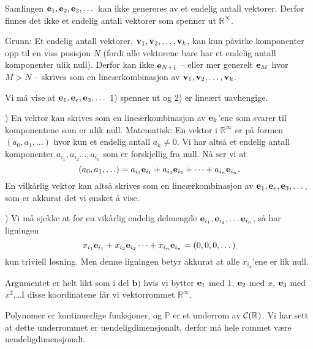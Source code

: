 \begin{losning}

\begin{punkt}
Samlingen $\mathbf{e}_1,\mathbf{e}_2,\mathbf{e}_3,\dots$ kan ikke genereres av et endelig antall vektorer. Derfor finnes det ikke et endelig antall vektorer som spenner ut $\mathbb{R}^\infty$.

\noindent
Grunn: Et endelig antall vektorer, $\mathbf{v}_1,\mathbf{v}_2,\dots,\mathbf{v}_k$, kan kun påvirke komponenter opp til en viss posisjon $N$ (fordi alle vektorene bare har et endelig antall komponenter ulik null). Derfor kan ikke $\mathbf{e}_{N+1}$ -- eller mer generelt $\mathbf{e}_M$ hvor $M>N$ -- skrives som en lineærkombinasjon av $\mathbf{v}_1,\mathbf{v}_2,\dots,\mathbf{v}_k$.
\end{punkt}

\begin{punkt}
Vi må vise at $\mathbf{e}_1,\mathbf{e}_e,\mathbf{e}_3,\dots$ 1) spenner ut og 2) er lineært uavhengige.

) En vektor kan skrives som en lineærkombinasjon av $\mathbf{e}_k$'ene som svarer til komponentene som er ulik null. Matematisk: En vektor i $\mathbb{R}^\infty$ er på formen $(a_0,a_1,\ldots)$ hvor kun et endelig antall $a_k\neq 0$. Vi har altså et endelig antall komponenter $a_{i_1},a_{i_2}\dots,a_{i_n}$ som er forskjellig fra null. Nå ser vi at $$(a_0,a_1,\ldots)=a_{i_1}\mathbf{e}_{i_1}+a_{i_2}\mathbf{e}_{i_2}+\dots+a_{i_n}\mathbf{e}_{i_n}.$$ En vilkårlig vektor kan altså skrives som en lineærkombinasjon av $\mathbf{e}_1,\mathbf{e}_e,\mathbf{e}_3,\dots$, som er akkurat det vi ønsket å vise.

) Vi må sjekke at for en vikårlig endelig delmengde $\mathbf{e}_{i_1},\mathbf{e}_{i_2},\dots\mathbf{e}_{i_n}$, så har ligningen $$x_{i_1}\mathbf{e}_{i_1}+x_{i_2}\mathbf{e}_{i_2}\dots+x_{i_n}\mathbf{e}_{i_n}=(0,0,0,\dots)$$ kun triviell løsning. Men denne ligningen betyr akkurat at alle $x_{i_k}$'ene er lik null.
\end{punkt}


\begin{punkt}
Argumentet er helt likt som i del $\textbf{b)}$ hvis vi bytter $\mathbf{e}_1$ med 1, $\mathbf{e}_2$ med $x$, $\mathbf{e}_3$ med $x^2$,\ldots I disse koordinatene får vi vektorrommet $\mathbb{R}^\infty$.
\end{punkt}

\begin{punkt}
Polynomer er kontinuerlige funksjoner, og $\mathbb{P}$ er et underrom av $\mathcal{C}(\mathbb{R})$. Vi har sett at dette underrommet er uendeligdimensjonalt, derfor må hele rommet være uendeligdimensjonalt.
\end{punkt}

\end{losning}




